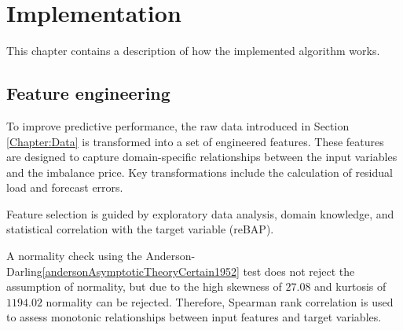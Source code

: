 \documentclass[class=scrbook, crop=false]{standalone}
\begin{document}
\chapter{Implementation} %
\label{Chapter::Implementation}
    This chapter contains a description of how the implemented algorithm works.

\section{Feature engineering}
\label{Section::Feature_engineering}
To improve predictive performance, the raw data introduced in Section \ref{Chapter:Data} is transformed into a set of engineered features. These features are designed to capture domain-specific relationships between the input variables and the imbalance price. Key transformations include the calculation of residual load and forecast errors.

Feature selection is guided by exploratory data analysis, domain knowledge, and statistical correlation with the target variable (reBAP).

A normality check using the Anderson-Darling\ref{andersonAsymptoticTheoryCertain1952} test does not reject the assumption of normality, but due to the high skewness of $27.08$ and kurtosis of $1194.02$ normality can be rejected. Therefore, Spearman rank correlation is used to assess monotonic relationships between input features and target variables.



\end{document}
